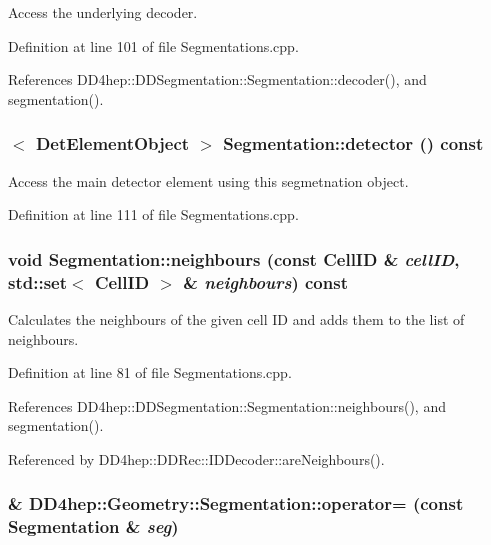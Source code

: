 Access the underlying decoder. 

Definition at line 101 of file Segmentations.cpp.

References DD4hep::DDSegmentation::Segmentation::decoder(), and segmentation().\hypertarget{class_d_d4hep_1_1_geometry_1_1_segmentation_ac2b190aa90d1aab39f40d63ae000c614}{
\subsubsection[{detector}]{$<$ {\bf DetElementObject} $>$ Segmentation::detector () const}}
\label{class_d_d4hep_1_1_geometry_1_1_segmentation_ac2b190aa90d1aab39f40d63ae000c614}


Access the main detector element using this segmetnation object. 

Definition at line 111 of file Segmentations.cpp.\hypertarget{class_d_d4hep_1_1_geometry_1_1_segmentation_abdda7033305b6df79627598d9d0e67e2}{
\subsubsection[{neighbours}]{\setlength{\rightskip}{0pt plus 5cm}void Segmentation::neighbours (const CellID \& {\em cellID}, \/  std::set$<$ CellID $>$ \& {\em neighbours}) const}}
\label{class_d_d4hep_1_1_geometry_1_1_segmentation_abdda7033305b6df79627598d9d0e67e2}


Calculates the neighbours of the given cell ID and adds them to the list of neighbours. 

Definition at line 81 of file Segmentations.cpp.

References DD4hep::DDSegmentation::Segmentation::neighbours(), and segmentation().

Referenced by DD4hep::DDRec::IDDecoder::areNeighbours().\hypertarget{class_d_d4hep_1_1_geometry_1_1_segmentation_ace2a6174d3578ff2fdee66e0de399219}{
\subsubsection[{operator=}]{\& DD4hep::Geometry::Segmentation::operator= (const {\bf Segmentation} \& {\em seg})}}
\label{class_d_d4hep_1_1_geometry_1_1_segmentation_ace2a6174d3578ff2fdee66e0de399219}


